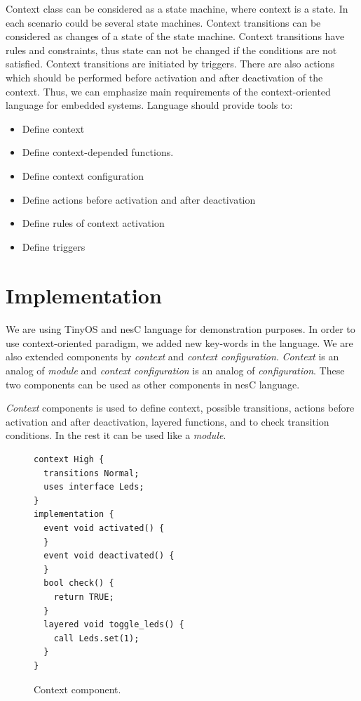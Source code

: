 \documentclass[12pt,a4paper]{article}
\begin{document}
Context class can be considered as a state machine, where context is a state. In each scenario could be several state machines. Context transitions can be considered as changes of a state of the state machine. Context transitions have rules and constraints, thus state can not be changed if the conditions are not satisfied. Context transitions are initiated by triggers. There are also actions which should be performed before activation and after deactivation of the context. Thus, we can emphasize main requirements of the context-oriented language for embedded systems. Language should provide tools to:
\begin{itemize}
\item Define context
\item Define context-depended functions.
\item Define context configuration
\item Define actions before activation and after deactivation
\item Define rules of context activation
\item Define triggers
\end{itemize}

\section{Implementation}
\paragraph{}
We are using TinyOS and nesC language for demonstration purposes. In order to use context-oriented paradigm, we added new key-words in the language. We are also extended components by \textit{context} and \textit{context configuration}. \textit{Context} is an analog of \textit{module} and \textit{context configuration} is an analog of \textit{configuration}. These two components can be used as other components in nesC language.

\textit{Context} components is used to define context, possible transitions, actions before activation and after deactivation, layered functions, and to check transition conditions. In the rest it can be used like a \textit{module}.

\begin{figure}[H]
\begin{lstlisting}
context High {
  transitions Normal;
  uses interface Leds;
}
implementation {
  event void activated() {
  }
  event void deactivated() {
  }
  bool check() {
    return TRUE;
  }
  layered void toggle_leds() {
    call Leds.set(1);
  }
}
\end{lstlisting}
\caption{Context component.}
\label{fig:cc}
\end{figure}
\end{document}
